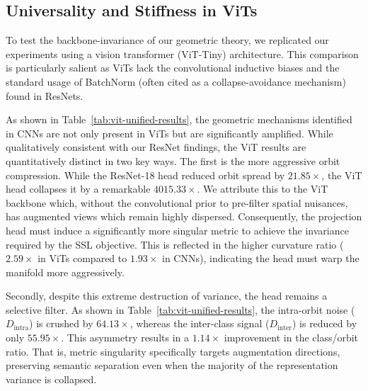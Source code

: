 \documentclass{article}
\theoremstyle{plain}
\theoremstyle{definition}
\theoremstyle{remark}
\begin{document}
\subsection{Universality and Stiffness in ViTs}
\label{app:vit}

To test the backbone-invariance of our geometric theory, we replicated our experiments using a vision transformer (ViT-Tiny) architecture. This comparison is particularly salient as ViTs lack the convolutional inductive biases and the standard usage of BatchNorm (often cited as a collapse-avoidance mechanism) found in ResNets.

As shown in Table~\ref{tab:vit-unified-results}, the geometric mechanisms identified in CNNs are not only present in ViTs but are significantly amplified. While qualitatively consistent with our ResNet findings, the ViT results are quantitatively distinct in two key ways. The first is the more aggressive orbit compression. While the ResNet-18 head reduced orbit spread by $21.85\times$, the ViT head collapses it by a remarkable $4015.33\times$. We attribute this to the ViT backbone which, without the convolutional prior to pre-filter spatial nuisances, has augmented views which remain highly dispersed. Consequently, the projection head must induce a significantly more singular metric to achieve the invariance required by the SSL objective. This is reflected in the higher curvature ratio ($2.59\times$ in ViTs compared to $1.93\times$ in CNNs), indicating the head must warp the manifold more aggressively.  

Secondly, despite this extreme destruction of variance, the head remains a selective filter. As shown in Table~\ref{tab:vit-unified-results}, the intra-orbit noise ($D_{\text{intra}}$) is crushed by $64.13\times$, whereas the inter-class signal ($D_{\text{inter}}$) is reduced by only $55.95\times$. This asymmetry results in a $1.14\times$ improvement in the class/orbit ratio. That is, metric singularity specifically targets augmentation directions, preserving semantic separation even when the majority of the representation variance is collapsed.
\end{document}
